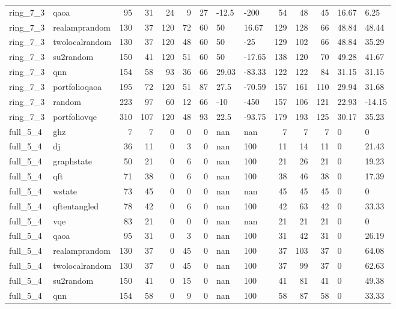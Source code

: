 \begin{longtable}{llrrrrrllrrrll}
ring\_7\_3 & qaoa & 95 & 31 & 24 & 9 & 27 & -12.5 & -200 & 54 & 48 & 45 & 16.67 & 6.25 \\
ring\_7\_3 & realamprandom & 130 & 37 & 120 & 72 & 60 & 50 & 16.67 & 129 & 128 & 66 & 48.84 & 48.44 \\
ring\_7\_3 & twolocalrandom & 130 & 37 & 120 & 48 & 60 & 50 & -25 & 129 & 102 & 66 & 48.84 & 35.29 \\
ring\_7\_3 & su2random & 150 & 41 & 120 & 51 & 60 & 50 & -17.65 & 138 & 120 & 70 & 49.28 & 41.67 \\
ring\_7\_3 & qnn & 154 & 58 & 93 & 36 & 66 & 29.03 & -83.33 & 122 & 122 & 84 & 31.15 & 31.15 \\
ring\_7\_3 & portfolioqaoa & 195 & 72 & 120 & 51 & 87 & 27.5 & -70.59 & 157 & 161 & 110 & 29.94 & 31.68 \\
ring\_7\_3 & random & 223 & 97 & 60 & 12 & 66 & -10 & -450 & 157 & 106 & 121 & 22.93 & -14.15 \\
ring\_7\_3 & portfoliovqe & 310 & 107 & 120 & 48 & 93 & 22.5 & -93.75 & 179 & 193 & 125 & 30.17 & 35.23 \\
full\_5\_4 & ghz & 7 & 7 & 0 & 0 & 0 & nan & nan & 7 & 7 & 7 & 0 & 0 \\
full\_5\_4 & dj & 36 & 11 & 0 & 3 & 0 & nan & 100 & 11 & 14 & 11 & 0 & 21.43 \\
full\_5\_4 & graphstate & 50 & 21 & 0 & 6 & 0 & nan & 100 & 21 & 26 & 21 & 0 & 19.23 \\
full\_5\_4 & qft & 71 & 38 & 0 & 6 & 0 & nan & 100 & 38 & 46 & 38 & 0 & 17.39 \\
full\_5\_4 & wstate & 73 & 45 & 0 & 0 & 0 & nan & nan & 45 & 45 & 45 & 0 & 0 \\
full\_5\_4 & qftentangled & 78 & 42 & 0 & 6 & 0 & nan & 100 & 42 & 63 & 42 & 0 & 33.33 \\
full\_5\_4 & vqe & 83 & 21 & 0 & 0 & 0 & nan & nan & 21 & 21 & 21 & 0 & 0 \\
full\_5\_4 & qaoa & 95 & 31 & 0 & 3 & 0 & nan & 100 & 31 & 42 & 31 & 0 & 26.19 \\
full\_5\_4 & realamprandom & 130 & 37 & 0 & 45 & 0 & nan & 100 & 37 & 103 & 37 & 0 & 64.08 \\
full\_5\_4 & twolocalrandom & 130 & 37 & 0 & 45 & 0 & nan & 100 & 37 & 99 & 37 & 0 & 62.63 \\
full\_5\_4 & su2random & 150 & 41 & 0 & 15 & 0 & nan & 100 & 41 & 81 & 41 & 0 & 49.38 \\
full\_5\_4 & qnn & 154 & 58 & 0 & 9 & 0 & nan & 100 & 58 & 87 & 58 & 0 & 33.33 \\

\end{longtable}
